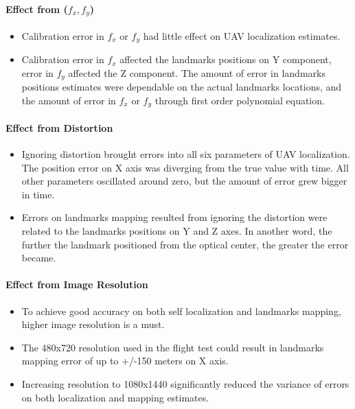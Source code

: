 \paragraph{Effect from ($f_x, f_y$)}
\begin{itemize}
  \item Calibration error in $f_x$ or $f_y$ had little effect on UAV
  localization estimates.
  \item Calibration error in $f_x$ affected the landmarks positions on
  Y component, error in $f_y$ affected the Z component. The amount of
  error in landmarks positions estimates were dependable on the actual
  landmarks locations, and the amount of error in $f_x$
  or $f_y$ through first order polynomial equation.
\end{itemize}

\paragraph{Effect from Distortion}
\begin{itemize}
  \item Ignoring distortion brought errors into all six parameters of
  UAV localization. The position error on X axis was diverging
  from the true value with time. All other parameters oscillated around
  zero, but the amount of error grew bigger in time.
  \item Errors on landmarks mapping resulted from ignoring the
  distortion were related to the landmarks positions on Y and Z axes.
  In another word, the further the landmark positioned from the
  optical center, the greater the error became.
\end{itemize}

\paragraph{Effect from Image Resolution}
\begin{itemize}
  \item To achieve good accuracy on both self localization and landmarks
  mapping, higher image resolution is a must.
  \item The 480x720 resolution used in the flight test could result in
  landmarks mapping error of up to +/-150 meters on X axis.
  \item Increasing resolution to 1080x1440 significantly reduced the
  variance of errors on both localization and mapping estimates.
\end{itemize}

